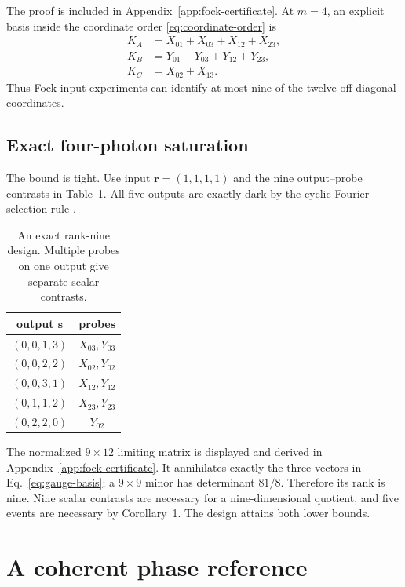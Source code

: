 \documentclass[aps,pra,reprint,amsmath,amssymb,superscriptaddress,longbibliography]{revtex4-2}
\begin{document}
The proof is included in Appendix~\ref{app:fock-certificate}.  At $m=4$,
an explicit basis inside the coordinate order
\eqref{eq:coordinate-order} is
\begin{align}
 K_A&=X_{01}+X_{03}+X_{12}+X_{23},\nonumber\\
 K_B&=Y_{01}-Y_{03}+Y_{12}+Y_{23},\nonumber\\
 K_C&=X_{02}+X_{13}.
\label{eq:gauge-basis}
\end{align}
Thus Fock-input experiments can identify at most nine of the twelve
off-diagonal coordinates.

\subsection{Exact four-photon saturation}

The bound is tight.  Use input $\bm r=(1,1,1,1)$ and the nine
output--probe contrasts in Table~\ref{tab:fock-design}.  All five outputs
are exactly dark by the cyclic Fourier selection rule
\cite{Tichy2010,Dittel2018PRA}.
\begin{table}[t]
\caption{An exact rank-nine design.  Multiple probes on one output give
separate scalar contrasts.}
\label{tab:fock-design}
\begin{ruledtabular}
\begin{tabular}{cc}
output $\bm s$ & probes\\
\hline
$(0,0,1,3)$ & $X_{03},Y_{03}$\\
$(0,0,2,2)$ & $X_{02},Y_{02}$\\
$(0,0,3,1)$ & $X_{12},Y_{12}$\\
$(0,1,1,2)$ & $X_{23},Y_{23}$\\
$(0,2,2,0)$ & $Y_{02}$
\end{tabular}
\end{ruledtabular}
\end{table}

The normalized $9\times12$ limiting matrix is displayed and derived in
Appendix~\ref{app:fock-certificate}.  It annihilates exactly the three
vectors in Eq.~\eqref{eq:gauge-basis}; a $9\times9$ minor has determinant
$81/8$.  Therefore its rank is nine.  Nine scalar contrasts are necessary
for a nine-dimensional quotient, and five events are necessary by
Corollary~1.  The design attains both lower bounds.

\section{A coherent phase reference}
\label{sec:cat}
\end{document}

